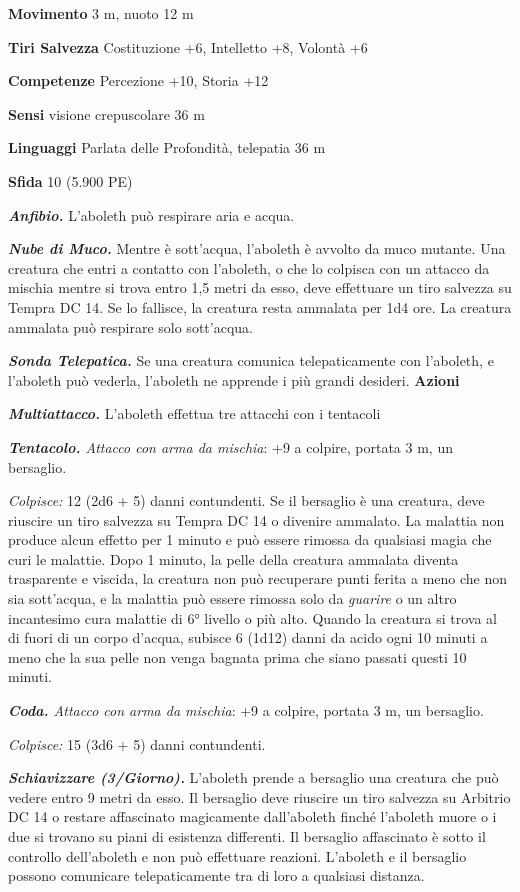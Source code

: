\begin{multicols}{2}
\textbf{Movimento} 3 m, nuoto 12 m

\textbf{Tiri Salvezza} Costituzione +6, Intelletto +8, Volontà +6

\textbf{Competenze} Percezione +10, Storia +12

\textbf{Sensi} visione crepuscolare 36 m

\textbf{Linguaggi} Parlata delle Profondità, telepatia 36 m

\textbf{Sfida} 10 (5.900 PE)

\emph{\textbf{Anfibio.}} L'aboleth può respirare aria e acqua.

\emph{\textbf{Nube di Muco.}} Mentre è sott'acqua, l'aboleth è avvolto da muco mutante. Una creatura che entri a contatto con l'aboleth, o che lo colpisca con un attacco da mischia mentre si trova entro 1,5 metri da esso, deve effettuare un tiro salvezza su Tempra DC 14. Se lo fallisce, la creatura resta ammalata per 1d4 ore. La creatura ammalata può respirare solo sott'acqua.

\emph{\textbf{Sonda Telepatica.}} Se una creatura comunica telepaticamente con l'aboleth, e l'aboleth può vederla, l'aboleth ne apprende i più grandi desideri. 
\textbf{Azioni}

\emph{\textbf{Multiattacco.}} L'aboleth effettua tre attacchi con i
tentacoli

\emph{\textbf{Tentacolo.} Attacco con arma da mischia}: +9 a colpire,
portata 3 m, un bersaglio.

\emph{Colpisce:} 12 (2d6 + 5) danni contundenti. Se il bersaglio è una
creatura, deve riuscire un tiro salvezza su Tempra DC 14 o
divenire ammalato. La malattia non produce alcun effetto per 1 minuto e
può essere rimossa da qualsiasi magia che curi le malattie. Dopo 1
minuto, la pelle della creatura ammalata diventa trasparente e viscida,
la creatura non può recuperare punti ferita a meno che non sia
sott'acqua, e la malattia può essere rimossa solo da \emph{guarire} o un
altro incantesimo cura malattie di 6° livello o più alto. Quando la
creatura si trova al di fuori di un corpo d'acqua, subisce 6 (1d12)
danni da acido ogni 10 minuti a meno che la sua pelle non venga bagnata
prima che siano passati questi 10 minuti.

\emph{\textbf{Coda.} Attacco con arma da mischia}: +9 a colpire, portata
3 m, un bersaglio.

\emph{Colpisce:} 15 (3d6 + 5) danni contundenti.

\emph{\textbf{Schiavizzare (3/Giorno).}} L'aboleth prende a bersaglio
una creatura che può vedere entro 9 metri da esso. Il bersaglio deve
riuscire un tiro salvezza su Arbitrio DC 14 o restare affascinato
magicamente dall'aboleth finché l'aboleth muore o i due si trovano su
piani di esistenza differenti. Il bersaglio affascinato è sotto il
controllo dell'aboleth e non può effettuare reazioni. L'aboleth e il
bersaglio possono comunicare telepaticamente tra di loro a qualsiasi
distanza.


\end{multicols}
